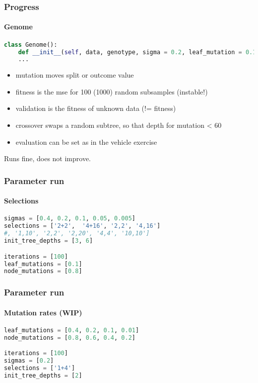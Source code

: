 \documentclass{beamer}
\begin{document}
\begin{frame}[fragile]
\frametitle{Progress}
\framesubtitle{Genome}

\begin{lstlisting}[language=Python]
class Genome():
    def __init__(self, data, genotype, sigma = 0.2, leaf_mutation = 0.1, node_mutation = 0.8, predict_feat = 'Energie'):
    ...
\end{lstlisting}

\begin{itemize}
\item mutation moves split or outcome value
\item fitness is the mse for 100 (1000) random subsamples (instable!)
\item validation is the fitness of unknown data (!= fitness)
\item crossover swaps a random subtree, so that depth for mutation < 60
\item evaluation can be set as in the vehicle exercise
\end{itemize}
\hbox{}
Runs fine, does not improve.
\end{frame}


\begin{frame}[fragile]
\frametitle{Parameter run}
\framesubtitle{Selections}
\begin{lstlisting}[language=Python]
sigmas = [0.4, 0.2, 0.1, 0.05, 0.005]
selections = ['2+2',  '4+16', '2,2', '4,16']
#, '1,10', '2,2', '2,20', '4,4', '10,10']
init_tree_depths = [3, 6]

iterations = [100]
leaf_mutations = [0.1]
node_mutations = [0.8]
\end{lstlisting}



\end{frame}


\begin{frame}[fragile]
\frametitle{Parameter run}
\framesubtitle{Mutation rates (WIP)}

\begin{lstlisting}[language=Python]
leaf_mutations = [0.4, 0.2, 0.1, 0.01]
node_mutations = [0.8, 0.6, 0.4, 0.2]

iterations = [100]
sigmas = [0.2]
selections = ['1+4']
init_tree_depths = [2]

\end{lstlisting}


\end{frame}
\end{document}
